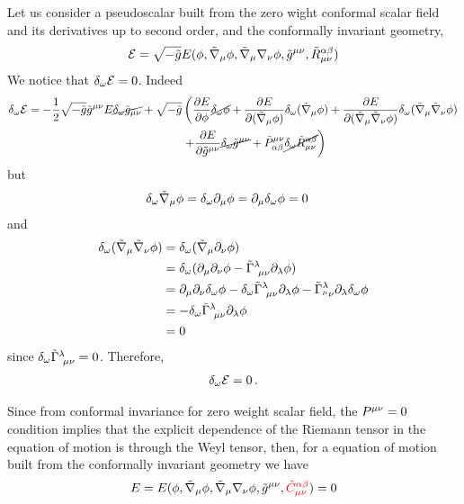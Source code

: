 Let us consider a pseudoscalar built from the zero wight conformal scalar field and its derivatives up to second order, and the conformally invariant geometry,
\begin{equation}
  \mathcal{E}=\sqrt{-\tilde{g}}E(\phi,\tilde{\nabla}_\mu\phi ,\tilde{\nabla}_\mu\nabla_\nu \phi ,\tilde{g}^{\mu\nu },\tilde{R}_{\mu\nu }^{\alpha\beta })
\end{equation}
We notice that $\delta_\omega\mathcal{E}=0$. Indeed
\begin{align*}
  \delta_\omega\mathcal{E}=-\frac{1}{2}\sqrt{-\tilde{g}}\tilde{g}^{\mu\nu }E\cancel{\delta_\omega\tilde{g}_{\mu\nu }}+\sqrt{-\tilde{g}}&\left(\pdv{E}{\phi}\cancel{\delta_\omega\phi} +\pdv{E}{(\tilde{\nabla}_\mu\phi)}\delta_\omega (\tilde{\nabla}_\mu\phi )+\pdv{E}{(\tilde{\nabla}_\mu\tilde{\nabla}_\nu\phi)}\delta_\omega(\tilde{\nabla}_\mu\tilde{\nabla}_\nu\phi )\right.\\&\left. +\pdv{E}{\tilde{g}^{\mu\nu}}\cancel{\delta_\omega\tilde{g}^{\mu\nu }}+\tilde{P}^{\mu\nu }_{\alpha\beta}\cancel{\delta_\omega\tilde{R}^{\alpha\beta }_{\mu\nu }}\right)
\end{align*}
but
\begin{align}
  \delta_\omega\tilde{\nabla}_\mu\phi&=\delta_\omega\partial_\mu\phi =\partial_\mu\delta_\omega\phi=0
\end{align}
and
\begin{align}
  \delta_\omega(\tilde{\nabla}_\mu\tilde{\nabla}_\nu\phi )&=\delta_\omega(\tilde{\nabla}_\mu\partial_\nu \phi )\\
 &=\delta_\omega(\partial_\mu\partial_\nu \phi -\tilde{\Gamma}^{\lambda}_{~\mu\nu }\partial_\lambda\phi )\\
 &=\partial_\mu\partial_\nu \delta_\omega\phi -\delta_\omega\tilde{\Gamma}^\lambda_{~\mu\nu }\partial_\lambda\phi -\tilde{\Gamma}^\lambda_{^\mu\nu }\partial_\lambda \delta_\omega\phi \\
 &=-\delta_\omega\tilde{\Gamma}^\lambda_{~\mu\nu }\partial_\lambda\phi\\
 &=0
\end{align}
since $\delta_\omega\tilde{\Gamma}^\lambda_{~\mu\nu }=0$. Therefore,
\begin{align}
  \delta_\omega\mathcal{E}=0\, .
\end{align}


Since from conformal invariance for zero weight scalar field, the $P^{\mu\nu }=0$ condition implies that the explicit dependence of the Riemann tensor in the equation of motion is through the Weyl tensor, then,  for a equation of motion built from the conformally invariant geometry we have
\begin{equation}\label{EE}
  E=E(\phi,\tilde{\nabla}_\mu\phi ,\tilde{\nabla}_\mu\nabla_\nu \phi ,\tilde{g}^{\mu\nu },\textcolor{red}{\tilde{C}_{\mu\nu }^{\alpha\beta }})=0
\end{equation}

